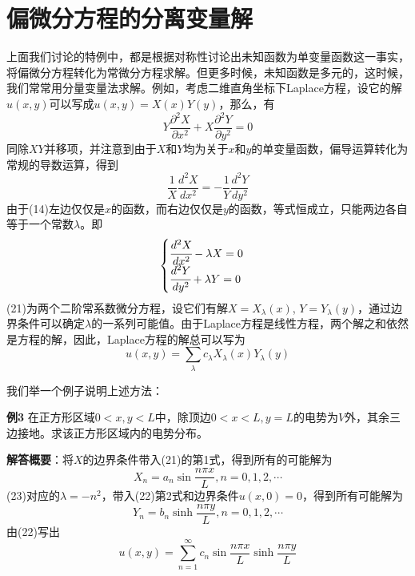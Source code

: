 \documentclass[a4paper,10pt]{ctexart}
\begin{document}
\section{偏微分方程的分离变量解}
上面我们讨论的特例中，都是根据对称性讨论出未知函数为单变量函数这一事实，将偏微分方程转化为常微分方程求解。但更多时候，未知函数是多元的，这时候，我们常常用分量变量法求解。例如，考虑二维直角坐标下Laplace方程，设它的解$u(x,y)$可以写成$u(x,y) = X(x)Y(y)$，那么，有
\begin{equation}
Y\frac{\partial^2 X}{\partial x^2} + X\frac{\partial^2 Y}{\partial y^2} = 0
\end{equation}
同除$XY$并移项，并注意到由于$X$和$Y$均为关于$x$和$y$的单变量函数，偏导运算转化为常规的导数运算，得到
\begin{equation}
\frac{1}{X} \frac{d^2 X}{d x^2} = -\frac{1}{Y} \frac{d^2 Y}{d y^2} 
\end{equation}
由于(14)左边仅仅是$x$的函数，而右边仅仅是$y$的函数，等式恒成立，只能两边各自等于一个常数$\lambda$。即
\begin{equation}
\begin{cases}
\cfrac{d^2 X}{dx^2} - \lambda X = 0 \\
\cfrac{d^2 Y}{dy^2} + \lambda Y = 0
\end{cases}
\end{equation}
(21)为两个二阶常系数微分方程，设它们有解$X=X_\lambda(x)$, $Y=Y_\lambda(y)$，通过边界条件可以确定$\lambda$的一系列可能值。由于Laplace方程是线性方程，两个解之和依然是方程的解，因此，Laplace方程的解总可以写为
\begin{equation}
u(x,y) = \sum_\lambda c_\lambda X_\lambda(x)Y_\lambda(y)
\end{equation}
\par
我们举一个例子说明上述方法：
\par
\textbf{例3} 在正方形区域$0<x,y<L$中，除顶边$0<x<L, y=L$的电势为$V$外，其余三边接地。求该正方形区域内的电势分布。\par
\textbf{解答概要}：将$X$的边界条件带入(21)的第1式，得到所有的可能解为
\begin{equation}
X_n = a_n \sin \frac{n\pi x}{L}, n=0,1,2,\cdots
\end{equation}
(23)对应的$\lambda=-n^2$，带入(22)第2式和边界条件$u(x,0)=0$，得到所有可能解为
\begin{equation}
Y_n = b_n \sinh \frac{n\pi y}{L}, n=0,1,2,\cdots
\end{equation}
由(22)写出
\begin{equation}
u(x,y) = \sum_{n=1}^\infty c_n \sin \frac{n\pi x}{L} \sinh \frac{n\pi y}{L}
\end{equation}
\end{document}
